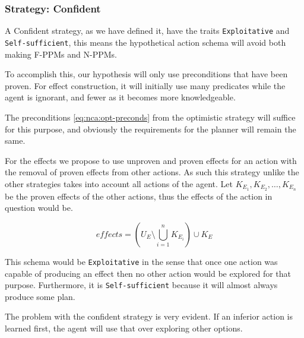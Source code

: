 \documentclass[../Master.tex]{subfiles}
\begin{document}
\subsubsection{Strategy: Confident}

A Confident strategy, as we have defined it, have the traits \texttt{Exploitative} and \texttt{Self-sufficient},
this means the hypothetical action schema will avoid both making F-PPMs and N-PPMs. 

To accomplish this, our hypothesis will only use preconditions that have been proven.
For effect construction, it will initially use many predicates while the agent is ignorant, and fewer as it becomes more knowledgeable. 

The preconditions \eqref{eq:nca:opt-preconds} from the optimistic strategy will suffice for this purpose, and obviously the requirements for the planner will remain the same.

For the effects we propose to use unproven and proven effects for an action with the removal of proven effects from other actions. 
As such this strategy unlike the other strategies takes into account all actions of the agent.
Let $K_{E_1},K_{E_2},\ldots,K_{E_n}$ be the proven effects of the other actions, thus the effects of the action in question would be.

\begin{equation}
		effects = \left( U_E \setminus \bigcup \limits_{i = 1} ^n K_{E_i} \right) \cup K_E
\end{equation}

This schema would be \texttt{Exploitative} in the sense that once one action was capable of producing an effect then no other action would be explored for that purpose. 
Furthermore, it is \texttt{Self-sufficient} because it will almost always produce some plan.

The problem with the confident strategy is very evident. If an inferior action is learned first, the agent will use that over exploring other options.
\end{document}
